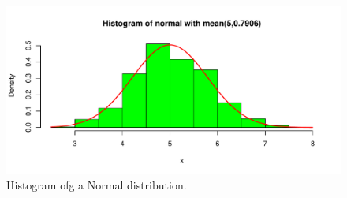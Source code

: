\documentclass[]{article}
\begin{document}
\begin{figure}[htbp]
\centering
\includegraphics{TCL_Convergence_files/figure-latex/unnamed-chunk-7-1.pdf}
\caption{Histogram ofg a Normal distribution.}
\end{figure}
\end{document}
